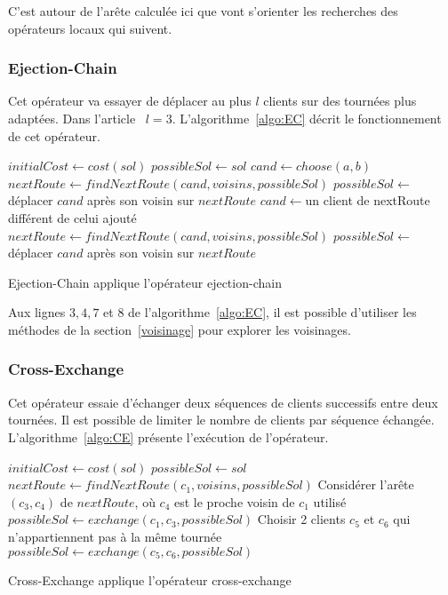 \documentclass[a4paper,11pt]{article}%
\begin{document}
C'est autour de l'arête calculée ici que vont s'orienter les recherches des opérateurs locaux qui suivent.
 
\subsubsection{Ejection-Chain}

Cet opérateur va essayer de déplacer au plus $l$ clients sur des tournées plus adaptées. Dans l'article~\cite{Sorensen_2017} $l = 3$.
L'algorithme~\ref{algo:EC} décrit le fonctionnement de cet opérateur.

\begin{algorithm}
\DontPrintSemicolon %
$initialCost \gets cost(sol)$\;
$possibleSol \gets sol$\;
$cand \gets choose(a,b)$\;
$nextRoute \gets findNextRoute(cand,voisins,possibleSol)$\;
$possibleSol \gets $ déplacer $cand$ après son voisin sur $nextRoute$\;
 {
  $cand \gets $un client de nextRoute différent de celui ajouté\;
  $nextRoute \gets findNextRoute(cand,voisins,possibleSol)$\;
  $possibleSol \gets$ déplacer $cand$ après son voisin sur $nextRoute$\;
}
 {
	\;
}
\;
\caption{{\sc Ejection-Chain} applique l'opérateur ejection-chain}
\label{algo:EC}
\end{algorithm}

Aux lignes $3, 4, 7$ et $8$ de l'algorithme~\ref{algo:EC}, il est possible d'utiliser les méthodes de la section~\ref{voisinage} pour explorer les voisinages.

\subsubsection{Cross-Exchange}

Cet opérateur essaie d'échanger deux séquences de clients successifs entre deux tournées. Il est possible de limiter le nombre de clients par séquence échangée.
L'algorithme~\ref{algo:CE} présente l'exécution de l'opérateur.

\begin{algorithm}
\DontPrintSemicolon %
$initialCost \gets cost(sol)$\;
$possibleSol \gets sol$\;
$nextRoute \gets findNextRoute(c_1,voisins,possibleSol)$\;
Considérer l'arête $(c_3,c_4)$ de $nextRoute$, où $c_4$ est le proche voisin de $c_1$ utilisé\;
$possibleSol \gets exchange(c_1,c_3,possibleSol)$\;
Choisir 2 clients $c_5$ et $c_6$ qui n'appartiennent pas à la même tournée\;
$possibleSol \gets exchange(c_5,c_6,possibleSol)$\;
 {
	\;
}
\;
\caption{{\sc Cross-Exchange} applique l'opérateur cross-exchange}
\label{algo:CE}
\end{algorithm}
\end{document}
